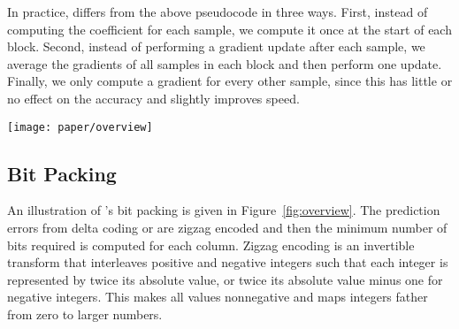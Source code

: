 In practice, \fire differs from the above pseudocode in three ways. First, instead of computing the coefficient for each sample, we compute it once at the start of each block. Second, instead of performing a gradient update after each sample, we average the gradients of all samples in each block and then perform one update. Finally, we only compute a gradient for every other sample, since this has little or no effect on the accuracy and slightly improves speed.

\begin{figure*}[t]
\begin{center}
    \texttt{[image: paper/overview]}
    \caption{Overview of \minesp using a delta coding predictor.\textit{ a)} Delta coding of each column, followed by zigzag encoding of resulting errors. The maximum number of significant (nonzero) bits is computed for each column. \textit{b)} These numbers of bits are stored in a header, and the original data is stored as a (byte-aligned) payload, with leading zeros removed. When there are few columns, each column's data is stored contiguously. When there are many columns, each row is stored contiguously, possibly with padding to ensure alignment on a byte boundary.}
    \label{fig:overview}
    \vspace{-5mm}
\end{center}
\end{figure*}

\subsection{Bit Packing} \label{sec:bitpacking}

An illustration of \mine's bit packing is given in Figure~\ref{fig:overview}. The prediction errors from delta coding or \fire are zigzag encoded \cite{zigzag} and then the minimum number of bits required is computed for each column. Zigzag encoding is an invertible transform that interleaves positive and negative integers such that each integer is represented by twice its absolute value, or twice its absolute value minus one for negative integers. This makes all values nonnegative and maps integers father from zero to larger numbers.

